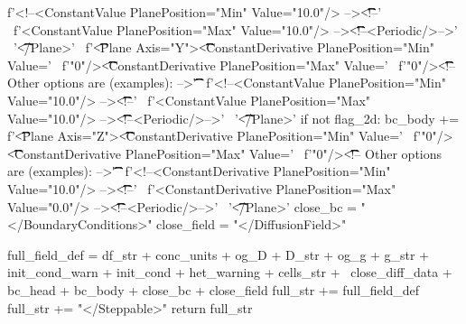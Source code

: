 \begin{python}
              f'<!--<ConstantValue PlanePosition="Min" Value="10.0"/> -->\n\t\t\t\t\t<!--' \
              f'<ConstantValue PlanePosition="Max" Value="10.0"/> -->\n\t\t\t\t\t<!--<Periodic/>-->' \
              '\t\t\t\t</Plane>\n' \
              f'\t\t\t\t<Plane Axis="Y">\n\t\t\t\t\t<ConstantDerivative PlanePosition="Min" Value=' \
              f'"0"/>\n\t\t\t\t\t<ConstantDerivative PlanePosition="Max" Value=' \
              f'"0"/>\n\t\t\t\t\t<!-- Other options are (examples): -->\n\t\t\t\t\t' \
              f'<!--<ConstantValue PlanePosition="Min" Value="10.0"/> -->\n\t\t\t\t\t<!--' \
              f'<ConstantValue PlanePosition="Max" Value="10.0"/> -->\n\t\t\t\t\t<!--<Periodic/>-->' \
              '\t\t\t\t</Plane>\n'
            if not flag_2d:
                bc_body += f'\t\t\t\t<Plane Axis="Z">\n\t\t\t\t\t<ConstantDerivative PlanePosition="Min" Value=' \
                   f'"0"/>\n\t\t\t\t\t<ConstantDerivative PlanePosition="Max" Value=' \
                   f'"0"/>\n\t\t\t\t\t<!-- Other options are (examples): -->\n\t\t\t\t\t' \
                   f'<!--<ConstantDerivative PlanePosition="Min" Value="10.0"/> -->\n\t\t\t\t\t<!--' \
                   f'<ConstantDerivative PlanePosition="Max" Value="0.0"/> -->\n\t\t\t\t\t<!--<Periodic/>-->' \
                   '\t\t\t\t</Plane>\n'
        close_bc = "</BoundaryConditions>\n"
        close_field = "</DiffusionField>\n"

        full_field_def = df_str + conc_units + og_D + D_str + og_g + g_str + init_cond_warn + init_cond + het_warning + cells_str + \
                         close_diff_data + bc_head + bc_body + close_bc + close_field
        full_str += full_field_def
    full_str += "</Steppable>\n"
    return full_str
\end{python}

